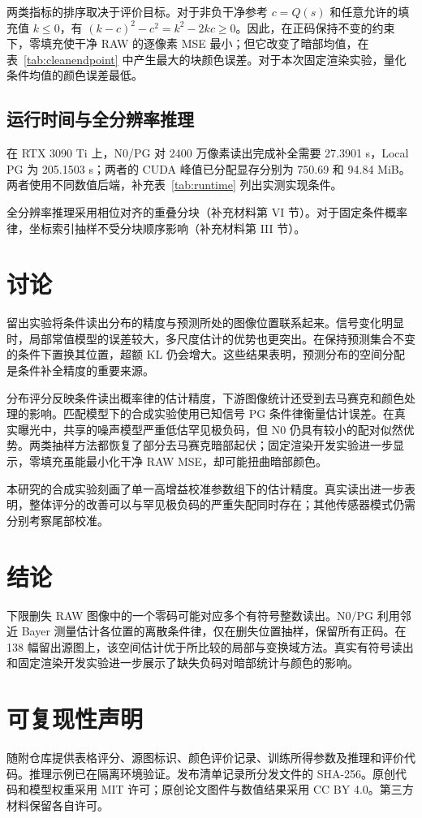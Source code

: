 \documentclass[10pt,twocolumn,journal]{IEEEtran}
\begin{document}
两类指标的排序取决于评价目标。对于非负干净参考 $c=Q(s)$ 和任意允许的填充值 $k\leq0$，有 $(k-c)^2-c^2=k^2-2kc\geq0$。因此，在正码保持不变的约束下，零填充使干净 RAW 的逐像素 MSE 最小；但它改变了暗部均值，在表~\ref{tab:cleanendpoint} 中产生最大的块颜色误差。对于本次固定渲染实验，量化条件均值的颜色误差最低。

\subsection{运行时间与全分辨率推理}\label{sec:runtime}
在 RTX 3090 Ti 上，N0/PG 对 2400 万像素读出完成补全需要 27.3901 s，Local PG 为 205.1503 s；两者的 CUDA 峰值已分配显存分别为 750.69 和 94.84 MiB。两者使用不同数值后端，补充表~\ref{tab:runtime} 列出实测实现条件。

全分辨率推理采用相位对齐的重叠分块（补充材料第 VI 节）。对于固定条件概率律，坐标索引抽样不受分块顺序影响（补充材料第 III 节）。

\section{讨论}
留出实验将条件读出分布的精度与预测所处的图像位置联系起来。信号变化明显时，局部常值模型的误差较大，多尺度估计的优势也更突出。在保持预测集合不变的条件下置换其位置，超额 KL 仍会增大。这些结果表明，预测分布的空间分配是条件补全精度的重要来源。

分布评分反映条件读出概率律的估计精度，下游图像统计还受到去马赛克和颜色处理的影响。匹配模型下的合成实验使用已知信号 PG 条件律衡量估计误差。在真实曝光中，共享的噪声模型严重低估罕见极负码，但 N0 仍具有较小的配对似然优势。两类抽样方法都恢复了部分去马赛克暗部起伏；固定渲染开发实验进一步显示，零填充虽能最小化干净 RAW MSE，却可能扭曲暗部颜色。

本研究的合成实验刻画了单一高增益校准参数组下的估计精度。真实读出进一步表明，整体评分的改善可以与罕见极负码的严重失配同时存在；其他传感器模式仍需分别考察尾部校准。

\section{结论}
下限删失 RAW 图像中的一个零码可能对应多个有符号整数读出。N0/PG 利用邻近 Bayer 测量估计各位置的离散条件律，仅在删失位置抽样，保留所有正码。在 138 幅留出源图上，该空间估计优于所比较的局部与变换域方法。真实有符号读出和固定渲染开发实验进一步展示了缺失负码对暗部统计与颜色的影响。

\section*{可复现性声明}
随附仓库提供表格评分、源图标识、颜色评价记录、训练所得参数及推理和评价代码。推理示例已在隔离环境验证。发布清单记录所分发文件的 SHA-256。原创代码和模型权重采用 MIT 许可；原创论文图件与数值结果采用 CC BY 4.0。第三方材料保留各自许可。
\end{document}
